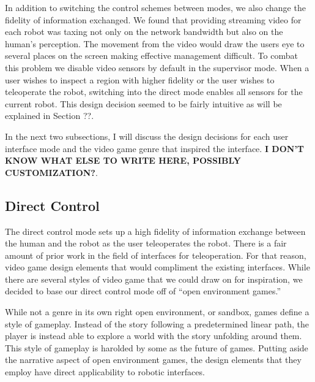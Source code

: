 In addition to switching the control schemes between modes, we also change the fidelity of information exchanged. We found that providing streaming video for each robot was taxing not only on the network bandwidth but also on the human's perception. The movement from the video would draw the users eye to several places on the screen making effective management difficult. To combat this problem we disable video sensors by default in the supervisor mode. When a user wishes to inspect a region with higher fidelity or the user wishes to teleoperate the robot, switching into the direct mode enables all sensors for the current robot. This design decision seemed to be fairly intuitive as will be explained in Section ??.

In the next two subsections, I will discuss the design decisions for each user interface mode and the video game genre that inspired the interface. \textbf{I DON'T KNOW WHAT ELSE TO WRITE HERE, POSSIBLY CUSTOMIZATION?}.

% 
\subsection{Direct Control}

The direct control mode sets up a high fidelity of information exchange between the human and the robot as the user teleoperates the robot. There is a fair amount of prior work in the field of interfaces for teleoperation. For that reason, video game design elements that would compliment the existing interfaces. While there are several styles of video game that we could draw on for inspiration, we decided to base our direct control mode off of ``open environment games.''

While not a genre in its own right open environment, or sandbox, games define a style of gameplay. Instead of the story following a predetermined linear path, the player is instead able to explore a world with the story unfolding around them. This style of gameplay is harolded by some as the future of games. Putting aside the narrative aspect of open environment games, the design elements that they employ have direct applicability to robotic interfaces.

